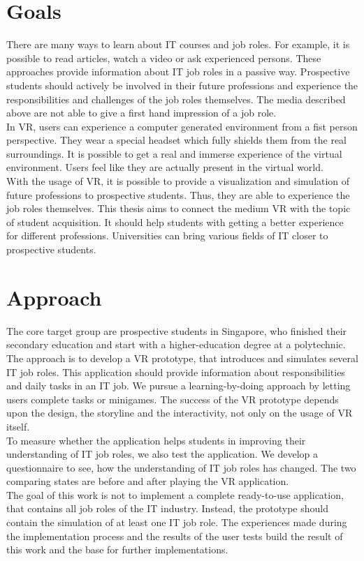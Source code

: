 \section{Goals}
There are many ways to learn about IT courses and job roles. For example, it is possible to read articles, watch a video or ask experienced persons. These approaches provide information about IT job roles in a passive way. Prospective students should actively be involved in their future professions and experience the responsibilities and challenges of the job roles themselves. The media described above are not able to give a first hand impression of a job role. \\
In VR, users can experience a computer generated environment from a fist person perspective. They wear a special headset which fully shields them from the real surroundings. It is possible to get a real and immerse experience of the virtual environment. Users feel like they are actually present in the virtual world. \cite{Linowes.2015}\\
With the usage of VR, it is possible to provide a visualization and simulation of future professions to prospective students. Thus, they are able to experience the job roles themselves. This thesis aims to connect the medium VR with the topic of student acquisition. It should help students with getting a better experience for different professions. Universities can bring various fields of IT closer to prospective students.

\section{Approach}
The core target group are prospective students in Singapore, who finished their secondary education and start with a higher-education degree at a polytechnic.\\
The approach is to develop a VR prototype, that introduces and simulates several IT job roles. This application should provide information about responsibilities and daily tasks in an IT job. We pursue a learning-by-doing approach by letting users complete tasks or minigames. The success of the VR prototype depends upon the design, the storyline and the interactivity, not only on the usage of VR itself.\\
To measure whether the application helps students in improving their understanding of IT job roles, we also test the application. We develop a questionnaire to see, how the understanding of IT job roles has changed. The two comparing states are before and after playing the VR application.\\
The goal of this work is not to implement a complete ready-to-use application, that contains all job roles of the IT industry. Instead, the prototype should contain the simulation of at least one IT job role. The experiences made during the implementation process and the results of the user tests build the result of this work and the base for further implementations.

